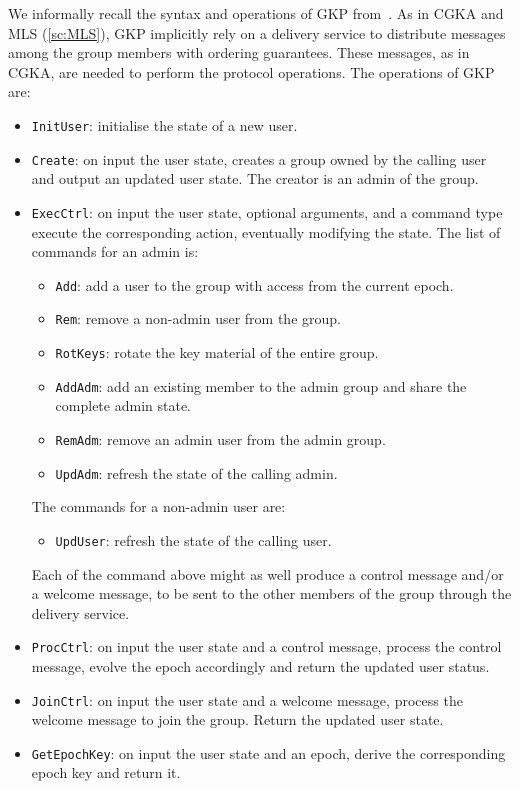 We informally recall the syntax and operations of GKP from~\cite{GKP}.
As in CGKA and MLS (\cref{sc:MLS}), GKP implicitly rely on a delivery service
to distribute messages among the group members with ordering guarantees.
These messages, as in CGKA, are needed to perform the protocol operations.
The operations of GKP are:
\begin{itemize}
    \item \texttt{InitUser}: initialise the state of a new user.
    \item \texttt{Create}: on input the user state, creates a group owned by the calling user and output an updated user state. The creator is an admin of the group.
    \item \texttt{ExecCtrl}: on input the user state, optional arguments, and a command type execute the corresponding action, eventually modifying the state. The list of commands for an admin is:
    \begin{itemize}
        \item \texttt{Add}: add a user to the group with access from the current epoch.
        \item \texttt{Rem}: remove a non-admin user from the group.
        \item \texttt{RotKeys}: rotate the key material of the entire group.
        \item \texttt{AddAdm}: add an existing member to the admin group and share the complete admin state.
        \item \texttt{RemAdm}: remove an admin user from the admin group.
        \item \texttt{UpdAdm}: refresh the state of the calling admin. 
    \end{itemize}
    The commands for a non-admin user are:
    \begin{itemize}
        \item \texttt{UpdUser}: refresh the state of the calling user.
    \end{itemize}
    Each of the command above might as well produce a control message and/or a welcome message, to be sent to the other members of the group through the delivery service.
    \item \texttt{ProcCtrl}: on input the user state and a control message, process the control message, evolve the epoch accordingly and return the updated user status.
    \item \texttt{JoinCtrl}: on input the user state and a welcome message, process the welcome message to join the group. Return the updated user state.
    \item \texttt{GetEpochKey}: on input the user state and an epoch, derive the corresponding epoch key and return it.
\end{itemize}

